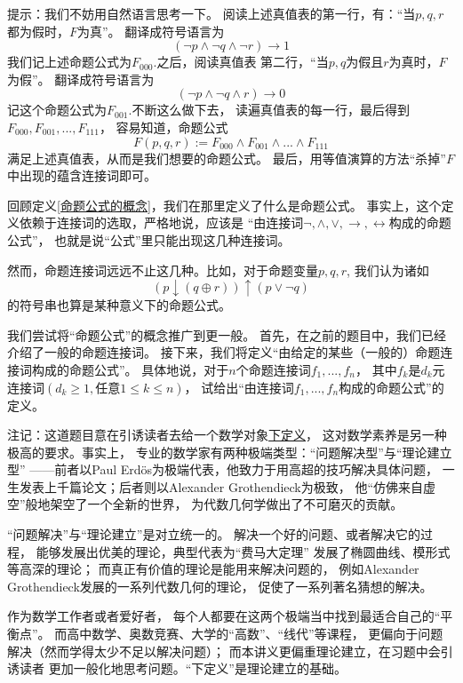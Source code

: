 提示：我们不妨用自然语言思考一下。
阅读上述真值表的第一行，有：“当$p,q,r$都为假时，$F$为真”。
翻译成符号语言为
$$(\neg p\wedge \neg q\wedge\neg r)\rightarrow 1$$
我们记上述命题公式为$F_{000}$.之后，阅读真值表
第二行，“当$p,q$为假且$r$为真时，$F$为假”。
翻译成符号语言为
$$(\neg p\wedge \neg q\wedge r)\rightarrow 0$$
记这个命题公式为$F_{001}$.不断这么做下去，
读遍真值表的每一行，最后得到$F_{000},F_{001},...,F_{111}$，
容易知道，命题公式
$$F(p,q,r):=F_{000}\wedge F_{001}\wedge...\wedge F_{111}$$
满足上述真值表，从而是我们想要的命题公式。
最后，用等值演算的方法“杀掉”$F$中出现的蕴含连接词即可。\vs

\begin{prob}[关于命题公式]
回顾定义\ref{命题公式的概念}，我们在那里定义了什么是命题公式。
事实上，这个定义依赖于连接词的选取，严格地说，应该是
“由连接词$\neg,\wedge,\vee,
\rightarrow,\leftrightarrow$构成的命题公式”，
也就是说“公式”里只能出现这几种连接词。

然而，命题连接词远远不止这几种。比如，对于命题变量$p,q,r$,
我们认为诸如
$$(p\downarrow(q\oplus r))\uparrow(p\vee\neg q)$$
的符号串也算是某种意义下的命题公式。

我们尝试将“命题公式”的概念推广到更一般。
首先，在之前的题目中，我们已经介绍了一般的命题连接词。
接下来，我们将定义“由给定的某些（一般的）命题连接词构成的命题公式”。
具体地说，对于$n$个命题连接词$f_1,...,f_n$，
其中$f_k$是$d_k$元连接词$(d_k\geq 1,\text{任意}1\leq k\leq n)$，
试给出“由连接词$f_1,...,f_n$构成的命题公式”的定义。
\end{prob}

注记：这道题目意在引诱读者去给一个数学对象\underline{下定义}，
这对数学素养是另一种极高的要求。事实上，
专业的数学家有两种极端类型：“问题解决型”与“理论建立型”
——前者以Paul Erd\"{o}s为极端代表，他致力于用高超的技巧解决具体问题，
一生发表上千篇论文；后者则以Alexander Grothendieck为极致，
他“仿佛来自虚空”般地架空了一个全新的世界，
为代数几何学做出了不可磨灭的贡献。

“问题解决”与“理论建立”是对立统一的。
解决一个好的问题、或者解决它的过程，
能够发展出优美的理论，典型代表为“费马大定理”
发展了椭圆曲线、模形式等高深的理论；
而真正有价值的理论是能用来解决问题的，
例如Alexander Grothendieck发展的一系列代数几何的理论，
促使了一系列著名猜想的解决。

作为数学工作者或者爱好者，
每个人都要在这两个极端当中找到最适合自己的“平衡点”。
而高中数学、奥数竞赛、大学的“高数”、“线代”等课程，
更偏向于问题解决（然而学得太少不足以解决问题）；
而本讲义更偏重理论建立，在习题中会引诱读者
更加一般化地思考问题。“下定义”是理论建立的基础。\vs


